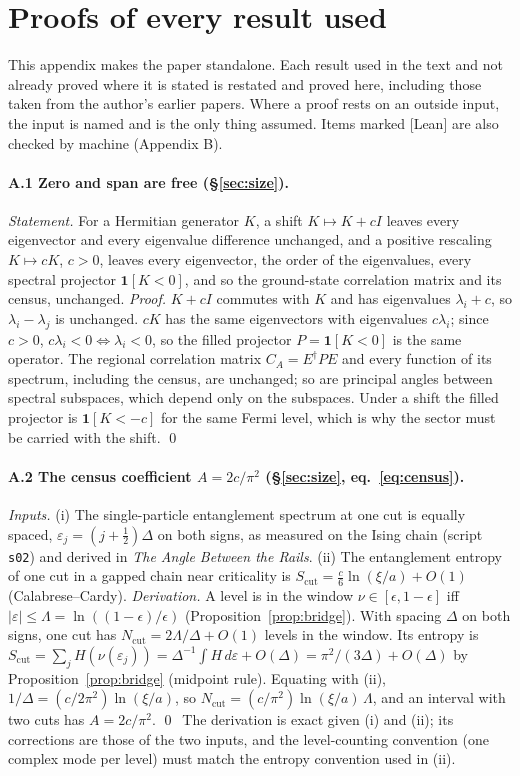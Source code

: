 \appendix
\section{Proofs of every result used}
This appendix makes the paper standalone. Each result used in the text and not already proved where it is stated is restated and proved here, including those taken from the author's earlier papers. Where a proof rests on an outside input, the input is named and is the only thing assumed. Items marked \textsf{[Lean]} are also checked by machine (Appendix B).

\paragraph{A.1 Zero and span are free (§\ref{sec:size}).}
\emph{Statement.} For a Hermitian generator $K$, a shift $K\mapsto K+cI$ leaves every eigenvector and every eigenvalue difference unchanged, and a positive rescaling $K\mapsto cK$, $c>0$, leaves every eigenvector, the order of the eigenvalues, every spectral projector $\mathbf 1[K<0]$, and so the ground-state correlation matrix and its census, unchanged.
\emph{Proof.} $K+cI$ commutes with $K$ and has eigenvalues $\lambda_i+c$, so $\lambda_i-\lambda_j$ is unchanged. $cK$ has the same eigenvectors with eigenvalues $c\lambda_i$; since $c>0$, $c\lambda_i<0\iff\lambda_i<0$, so the filled projector $P=\mathbf 1[K<0]$ is the same operator. The regional correlation matrix $C_A=E^\dagger PE$ and every function of its spectrum, including the census, are unchanged; so are principal angles between spectral subspaces, which depend only on the subspaces. Under a shift the filled projector is $\mathbf 1[K<-c]$ for the same Fermi level, which is why the sector must be carried with the shift. \qed

\paragraph{A.2 The census coefficient $A=2c/\pi^2$ (§\ref{sec:size}, eq.~\ref{eq:census}).}
\emph{Inputs.} (i) The single-particle entanglement spectrum at one cut is equally spaced, $\varepsilon_j=(j+\tfrac12)\Delta$ on both signs, as measured on the Ising chain (script \texttt{s02}) and derived in \emph{The Angle Between the Rails}. (ii) The entanglement entropy of one cut in a gapped chain near criticality is $S_{\mathrm{cut}}=\tfrac c6\ln(\xi/a)+O(1)$ (Calabrese–Cardy).
\emph{Derivation.} A level is in the window $\nu\in[\epsilon,1-\epsilon]$ iff $|\varepsilon|\le\Lambda=\ln((1-\epsilon)/\epsilon)$ (Proposition~\ref{prop:bridge}). With spacing $\Delta$ on both signs, one cut has $N_{\mathrm{cut}}=2\Lambda/\Delta+O(1)$ levels in the window. Its entropy is $S_{\mathrm{cut}}=\sum_jH(\nu(\varepsilon_j))=\Delta^{-1}\int H\,d\varepsilon+O(\Delta)=\pi^2/(3\Delta)+O(\Delta)$ by Proposition~\ref{prop:bridge} (midpoint rule). Equating with (ii), $1/\Delta=(c/2\pi^2)\ln(\xi/a)$, so $N_{\mathrm{cut}}=(c/\pi^2)\ln(\xi/a)\,\Lambda$, and an interval with two cuts has $A=2c/\pi^2$. \qed\ The derivation is exact given (i) and (ii); its corrections are those of the two inputs, and the level-counting convention (one complex mode per level) must match the entropy convention used in (ii).

